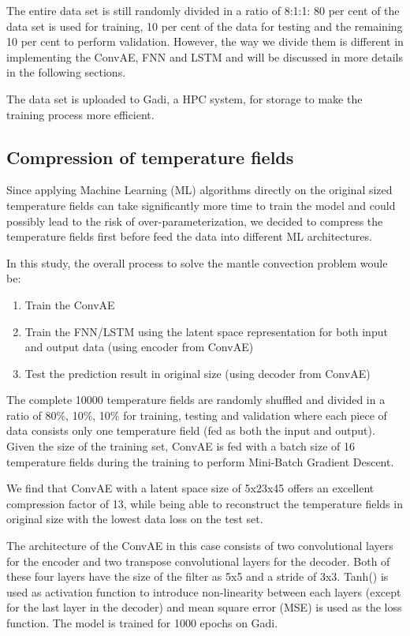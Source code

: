 The entire data set is still randomly divided in a ratio of 8:1:1: 80 per cent of the data set is used for training, 10 per cent of the data for testing and the remaining 10 per cent to perform validation. However, the way we divide them is different in implementing the ConvAE, FNN and LSTM and will be discussed in more details in the following sections.

The data set is uploaded to Gadi, a HPC system, for storage to make the training process more efficient. 

\subsection{Compression of temperature fields}

Since applying Machine Learning (ML) algorithms directly on the original sized temperature fields can take significantly more time to train the model and could possibly lead to the risk of over-parameterization, we decided to compress the temperature fields first before feed the data into different ML architectures.

In this study, the overall process to solve the mantle convection problem woule be: 

\begin{enumerate}
  \item Train the ConvAE
  \item Train the FNN/LSTM using the latent space representation for both input and output data (using encoder from ConvAE)
  \item Test the prediction result in original size (using decoder from ConvAE)
\end{enumerate}

The complete 10000 temperature fields are randomly shuffled and divided in a ratio of 80\%, 10\%, 10\% for training, testing and validation where each piece of data consists only one temperature field (fed as both the input and output). Given the size of the training set, ConvAE is fed with a batch size of 16 temperature fields during the training to perform Mini-Batch Gradient Descent.

We find that ConvAE with a latent space size of 5x23x45 offers an excellent compression factor of 13, while being able to reconstruct the temperature fields in original size with the lowest data loss on the test set.

The architecture of the ConvAE in this case consists of two convolutional layers for the encoder and two transpose convolutional layers for the decoder. Both of these four layers have the size of the filter as 5x5 and a stride of 3x3. Tanh() is used as activation function to introduce non-linearity between each layers (except for the last layer in the decoder) and mean square error (MSE) is used as the loss function. The model is trained for 1000 epochs on Gadi.

